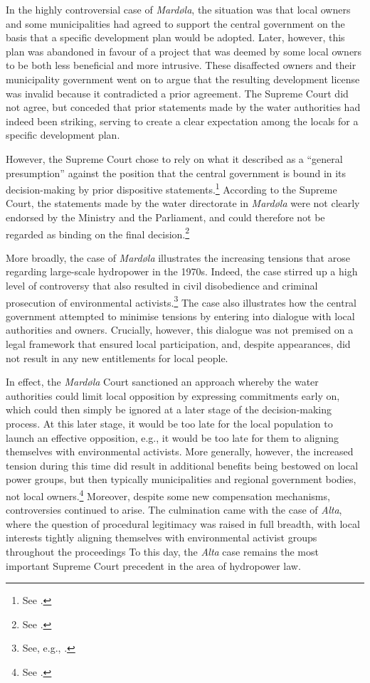 In the highly controversial case of {\it Mardøla}, the situation was that local owners and some municipalities had agreed to support the central government on the basis that a specific development plan would be adopted. Later, however, this plan was abandoned in favour of a project that was deemed by some local owners to be both less beneficial and more intrusive. These disaffected owners and their municipality government went on to argue that the resulting development license was invalid because it contradicted a prior agreement. The Supreme Court did not agree, but conceded that prior statements made by the water authorities had indeed been striking, serving to create a clear expectation among the locals for a specific development plan. 

However, the Supreme Court chose to rely on what it described as a ``general presumption'' against the position that the central government is bound in its decision-making by prior dispositive statements.\footnote{See \cite[110]{mardøla73}.} According to the Supreme Court, the statements made by the water directorate in {\it Mardøla} were not clearly endorsed by the Ministry and the Parliament, and could therefore not be regarded as binding on the final decision.\footnote{See \cite[111]{mardøla73}.} 

More broadly, the case of {\it Mardøla} illustrates the increasing tensions that arose regarding large-scale hydropower in the 1970s. Indeed, the case stirred up a high level of controversy that also resulted in civil disobedience and criminal prosecution of environmental activists.\footnote{See, e.g., \cite{71}.} The case also illustrates how the central government attempted to minimise tensions by entering into dialogue with local authorities and owners. Crucially, however, this dialogue was not premised on a legal framework that ensured local participation, and, despite appearances, did not result in any new entitlements for local people.

In effect, the {\it Mardøla} Court sanctioned an approach whereby the water authorities could limit local opposition by expressing commitments early on, which could then simply be ignored at a later stage of the decision-making process. At this later stage, it would be too late for the local population to launch an effective opposition, e.g., it would be too late for them to aligning themselves with environmental activists. More generally, however, the increased tension during this time did result in additional benefits being bestowed on local power groups, but then typically municipalities and regional government bodies, not local owners.\footnote{See \cite{....}.} Moreover, despite some new compensation mechanisms, controversies continued to arise. The culmination came with the case of {\it Alta}, where the question of procedural legitimacy was raised in full breadth, with local interests tightly aligning themselves with environmental activist groups throughout the proceedings To this day, the {\it Alta} case remains the most important Supreme Court precedent in the area of hydropower law.

